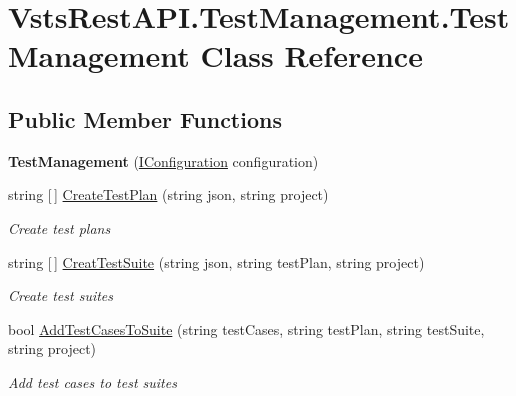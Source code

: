 \hypertarget{class_vsts_rest_a_p_i_1_1_test_management_1_1_test_management}{}\section{Vsts\+Rest\+A\+P\+I.\+Test\+Management.\+Test\+Management Class Reference}
\label{class_vsts_rest_a_p_i_1_1_test_management_1_1_test_management}
\subsection*{Public Member Functions}
\begin{DoxyCompactItemize}
\item 
\mbox{\label{class_vsts_rest_a_p_i_1_1_test_management_1_1_test_management_aaa430e73de355d3670c0eee2af182389}} 
{\bfseries Test\+Management} (\mbox{\hyperlink{interface_vsts_rest_a_p_i_1_1_i_configuration}{I\+Configuration}} configuration)
\item 
string \mbox{[}$\,$\mbox{]} \mbox{\hyperlink{class_vsts_rest_a_p_i_1_1_test_management_1_1_test_management_a32fa8edefb9a51e435dc084a0a05c542}{Create\+Test\+Plan}} (string json, string project)
\begin{DoxyCompactList}\small\item\em Create test plans \end{DoxyCompactList}\item 
string \mbox{[}$\,$\mbox{]} \mbox{\hyperlink{class_vsts_rest_a_p_i_1_1_test_management_1_1_test_management_a5327dfbebb20e530b39cfa6a95ddaa4a}{Creat\+Test\+Suite}} (string json, string test\+Plan, string project)
\begin{DoxyCompactList}\small\item\em Create test suites \end{DoxyCompactList}\item 
bool \mbox{\hyperlink{class_vsts_rest_a_p_i_1_1_test_management_1_1_test_management_a0c52041b2fed39904f0452d7ea26f51c}{Add\+Test\+Cases\+To\+Suite}} (string test\+Cases, string test\+Plan, string test\+Suite, string project)
\begin{DoxyCompactList}\small\item\em Add test cases to test suites \end{DoxyCompactList}\end{DoxyCompactItemize}
